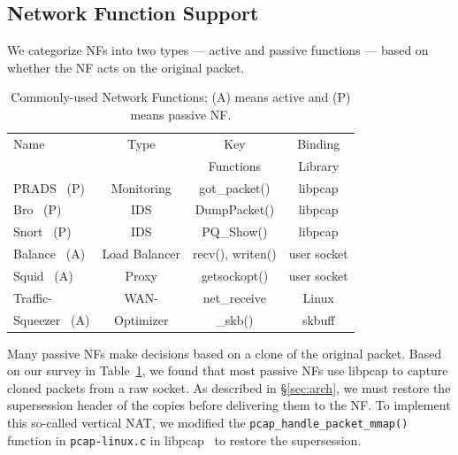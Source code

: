 \subsection{Network Function Support}\label{sec:NFsupport}

We categorize NFs into two types --- active and passive functions --- based on whether the NF acts on the original packet.  

\begin{table}[ht]\label{middleboxextension} 
\centering
 
\small
\begin{tabular} {|l |c |c |c|}
\hline

      Name          	  &         Type           & Key        	 &      Binding   \\
                      	  &                        &  Functions          &       Library  \\ \hline
PRADS~\cite{prads} (P) 	  &      Monitoring        &    got\_packet()      & libpcap   \\ \hline
Bro~\cite{bro} (P)      	  &      IDS               &   DumpPacket()      & libpcap   \\ \hline
Snort~\cite{snort} (P)  	  &        IDS         &    PQ\_Show()          & libpcap \\ \hline 
Balance~\cite{balance} (A)	  &      Load Balancer     &    recv(), writen()       &user socket\\ \hline
Squid~\cite{squid} (A) 	  &        Proxy           &  getsockopt()        & user socket  \\ \hline
Traffic- 		  &    WAN-                &     net\_receive       &Linux  \\ 
Squeezer~\cite{tsqueezer} (A)&Optimizer &\_skb()   & skbuff \\ \hline


\end{tabular}
\caption{\small Commonly-used Network Functions; (A) means active and (P) means passive NF. }\label{nfhook}
\end{table}


 Many passive NFs make decisions based on a clone of the original packet. Based on our survey in Table~\ref{nfhook}, we found that most passive NFs use libpcap to capture cloned packets from a raw socket. As described in \S\ref{sec:arch}, we must restore the supersession header of the copies before delivering them to the NF. 
To implement this so-called vertical NAT, we modified the \texttt{pcap\_handle\_packet\_mmap()} function in \texttt{pcap-linux.c} in libpcap~\cite{tcpdump} to restore the supersession. 

